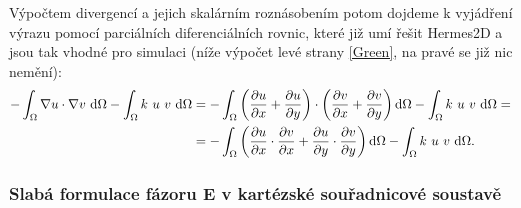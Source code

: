 \documentclass[12pt,a4paper,oneside]{article}
\numberwithin{equation}{section} %
\numberwithin{figure}{section} %
\numberwithin{table}{section} %
\begin{document}
Výpočtem divergencí a jejich skalárním roznásobením potom dojdeme k vyjádření výrazu pomocí parciálních diferenciálních rovnic, které již umí řešit Hermes2D a jsou tak vhodné pro simulaci (níže výpočet levé strany \ref{Green}, na pravé se již nic nemění):
\begin{equation}
\begin{split}
- \int _{\Omega} \nabla u \cdot \nabla v ~ \mathrm{d} \Omega - \int _{\Omega} k ~ u ~ v ~ \mathrm{d} \Omega &= - \int _{\Omega} \left( \frac{\partial u}{\partial x} + \frac{\partial u}{\partial y} \right) \cdot \left( \frac{\partial v}{\partial x} + \frac{\partial v}{\partial y} \right) \mathrm{d} \Omega - \int _{\Omega} k ~ u ~ v ~ \mathrm{d} \Omega =\\
&= - \int _{\Omega} \left( \frac{\partial u}{\partial x} \cdot \frac{\partial v}{\partial x} + \frac{\partial u}{\partial y} \cdot \frac{\partial v}{\partial y} \right) \mathrm{d} \Omega - \int _{\Omega} k ~ u ~ v ~ \mathrm{d} \Omega .
\end{split}
\end{equation}


\subsubsection{Slabá formulace fázoru E v kartézské souřadnicové soustavě}
\end{document}
